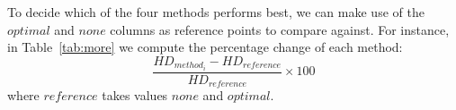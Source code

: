 



To decide which of the four methods performs best, we can make use of the $optimal$ and $none$ columns as reference points to compare against. 
For instance, in Table~\ref{tab:more} we compute the percentage change of each method:
$$\frac{HD_{method_i} - HD_{reference}}{HD_{reference}} \times 100$$ where $reference$ takes values $none$ and $optimal$.

